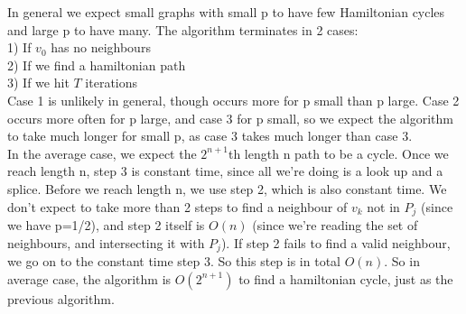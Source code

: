 \documentclass[10pt,a4paper]{report}
\begin{document}




In general we expect small graphs with small p to have few Hamiltonian cycles and large p to have many. The algorithm terminates in 2 cases:\\

1) If $v_0$ has no neighbours\\
2) If we find a hamiltonian path \\
3) If we hit $T$ iterations\\

Case 1 is unlikely in general, though occurs more for p small than p large. Case 2 occurs more often for p large, and case 3 for p small, so we expect the algorithm to take much longer for small p, as case 3 takes much longer than case 3. \\

In the average case, we expect the $2^{n+1}$th length n path to be a cycle. Once we reach length n, step 3 is constant time, since all we're doing is a look up and a splice. Before we reach length n, we use step 2, which is also constant time. We don't expect to take more than 2 steps to find a neighbour of $v_k$ not in $P_j$ (since we have p=1/2), and step 2 itself is $O(n)$ (since we're reading the set of neighbours, and intersecting it with $P_j$). If step 2 fails to find a valid neighbour, we go on to the constant time step 3. So this step is in total $O(n)$. So in average case, the algorithm is $O(2^{n+1})$ to find a hamiltonian cycle, just as the previous algorithm.\\
\end{document}

